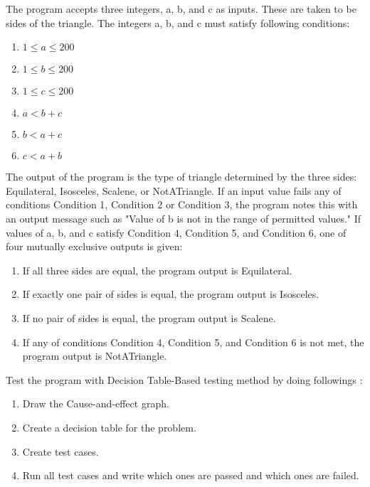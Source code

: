 \begin{exercise}
    The program accepts three integers, a, b, and c as inputs. These are taken to be sides of the triangle. The integers a, b, and c must satisfy following conditions:
    
    \begin{enumerate}[label=\textbf{Condition \arabic*:},left=0pt]
        \item $1 \le a \le 200$
        \item $1 \le b \le 200$
        \item $1 \le c \le 200$
        \item $a < b + c$
        \item $b < a + c$
        \item $c < a + b$
    \end{enumerate}
    
    The output of the program is the type of triangle determined by the three sides: Equilateral, Isosceles, Scalene, or NotATriangle. If an input value fails any of conditions Condition 1, Condition 2 or Condition 3, the program notes this with an output message such as "Value of b is not in the range of permitted values." If values of a, b, and c satisfy Condition 4, Condition 5, and Condition 6, one of four mutually exclusive outputs is given:
    
    \begin{enumerate}
        \item If all three sides are equal, the program output is Equilateral.
        \item If exactly one pair of sides is equal, the program output is Isosceles.
        \item If no pair of sides is equal, the program output is Scalene.
        \item If any of conditions Condition 4, Condition 5, and Condition 6 is not met, the program output is NotATriangle.
    \end{enumerate}
    
    Test the program with Decision Table-Based testing method by doing followings \autocite{jorgensen2013software}:
    \begin{enumerate}[label=\alph*)]
        \item Draw the Cause-and-effect graph.
        \item Create a decision table for the problem.
        \item Create test cases.
        \item Run all test cases and write which ones are passed and which ones are failed.
    \end{enumerate}


\end{exercise}
